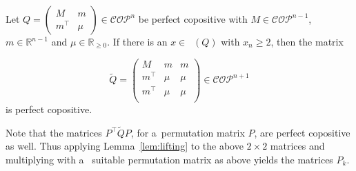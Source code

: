 \documentclass{commat}
\newcommand{\IR}{{\mathbb{R}}}
\newcommand{\IRgeo}{\IR_{\geq0}}
\newcommand{\cop}{{\mathcal{COP}}}
\newcommand{\copn}{{\mathcal{COP}}^{n}}
\DeclareMathOperator{\MinC}{Min_{\cop}}
\begin{document}
\begin{lemma}\label{lem:lifting}
	Let \(Q =
\begin{pmatrix}
M & m \\ m^\intercal & \mu
\end{pmatrix}
\in \copn \) be perfect
    copositive with \(M\in\mathcal{COP}^{n-1} \), \(m\in\IR^{n-1} \) and \(\mu\in\IRgeo \).
	If there is an \(x \in \MinC(Q) \) with \(x_n \geq 2 \), then the matrix
	
\[
		\widetilde{Q} =
\begin{pmatrix}
							M & m & m \\
							m^\intercal & \mu & \mu \\
							m^\intercal & \mu & \mu \\
						
\end{pmatrix}
\in\cop^{n+1}
\]
	is perfect copositive.
\end{lemma}
Note that the matrices \(P^\intercal\widetilde{Q}P \), for a~permutation matrix $P$,
are perfect copositive as well.
Thus applying Lemma~\ref{lem:lifting} to the above \(2\times2 \) matrices and multiplying with a~
suitable permutation matrix as above yields the matrices \(P_k \).
\end{document}
